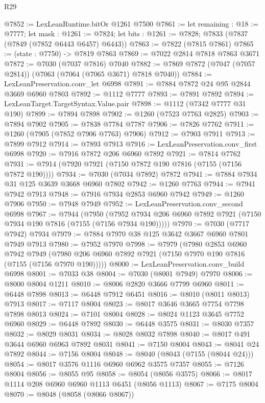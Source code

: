 \begin{lexlean}{R29}
\begin{coremodule}
@7852 := LexLeanRuntime.bitOr @1261 @7500
@7861 := let remaining : @18 := @7777;
  let mask : @1261 := @7824;
  let bits : @1261 := @7828; @7833 (@7837 (@7849 (@7852 @6443 @6457) @6443))
@7863 := @7822 (@7815 @7861)
@7865 := (state : @7750) -> @7819 @7863
@7869 := @7022 @2814 @7818 @7863 @3671
@7872 := @7030 (@7037 @7816) @7040
@7882 := @7869 @7872 (@7047 (@7057 @2814)) (@7063 (@7064 (@7065 @3671) @7818 @7040))
@7884 := LexLeanPreservation.conv_let @6998
@7891 := @7884 @7872 @24 @95 @2844 @3669 @6960 @7803
@7892 := @1112 @7777
@7893 := @7891 @7892
@7894 := LexLeanTarget.TargetSyntax.Value.pair
@7898 := @1112 (@7342 @7777 @31 @190)
@7899 := @7894 @7898
@7902 := @1260 (@7523 @7763 @2825)
@7903 := @7894 @7902
@7905 := @7838 @7784 @7787
@7906 := @7826 @7762
@7911 := @1260 (@7905 (@7852 @7906 @7763) @7906)
@7912 := @7903 @7911
@7913 := @7899 @7912
@7914 := @7893 @7913
@7916 := LexLeanPreservation.conv_first @6998
@7920 := @7916 @7872 @206 @6960 @7892
@7921 := @7814 @7762
@7931 := @7914 (@7920 @7921 (@7150 @7872 @190 @7816 (@7155 (@7156 @7872 @190))))
@7934 := @7030 (@7034 @7892) @7872
@7941 := @7884 @7934 @31 @125 @3639 @3668 @6960 @7802
@7942 := @1260 @7763
@7944 := @7941 @7942 @7913
@7948 := @7916 @7934 @2853 @6960 @7942
@7949 := @1260 @7906
@7950 := @7948 @7949
@7952 := LexLeanPreservation.conv_second @6998
@7967 := @7944
    (@7950 (@7952 @7934 @206 @6960 @7892 @7921 (@7150 @7934 @190 @7816 (@7155 (@7156 @7934 @190)))))
@7970 := @7030 (@7717 @7942) @7934
@7979 := @7884 @7970 @38 @125 @3642 @3667 @6960 @7801 @7949 @7913
@7980 := @7952 @7970
@7998 := @7979
    (@7980
      @2853
      @6960
      @7942
      @7949
      (@7980 @206 @6960 @7892 @7921 (@7150 @7970 @190 @7816 (@7155 (@7156 @7970 @190)))))
@8000 := LexLeanPreservation.conv_build @6998
@8001 := @7033 @38
@8004 := @7030 (@8001 @7949) @7970
@8006 := @8000 @8004 @1211
@8010 := @8006 @2820 @3666 @7799 @6960
@8011 := @6448 @7898
@8013 := @6448 @7912 @6451
@8016 := @8010 (@8011 @8013) @7913
@8017 := @7117 @8004
@8023 := @8017 @3646 @3665 @7754 @7798 @7898 @8013
@8024 := @7101 @8004
@8028 := @8024 @1123 @3645 @7752 @6960
@8029 := @6448 @7892
@8030 := @6448 @3575
@8031 := @8030 @7357
@8032 := @8029 @8031
@8034 := @8028 @8032 @7898
@8040 := @8017 @491 @3644 @6960 @6963 @7892 @8031
@8041 := @7150 @8004
@8043 := @8041 @24 @7892
@8044 := @7156 @8004
@8048 := @8040 (@8043 (@7155 (@8044 @24)))
@8054 := @8017 @3576 @1116 @6960 @6962 @3575 @7357
@8055 := @7126 @8004
@8056 := @8055 @95
@8058 := @8054 (@8056 @3575)
@8066 := @8017 @1114 @208 @6960 @6960 @1113 @6451 (@8056 @1113)
@8067 := @7175 @8004
@8070 := @8048 (@8058 (@8066 @8067))

\end{coremodule}
\end{lexlean}
